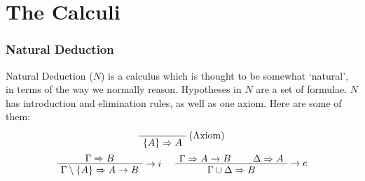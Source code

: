 \documentclass[english,svgnames,hide notes,12pt]{beamer}
\theoremstyle{definition}
\newtheorem{defn}{Definition}
\theoremstyle{remark}
\newtheorem{notn}{Notation}
\begin{document}

\section{The Calculi}

\begin{frame}
    \frametitle{Natural Deduction}
    Natural Deduction ($N$) is a calculus which is thought to be somewhat `natural', in terms of the way we normally reason. Hypotheses in $N$ are a set of formulae. $N$ has introduction and elimination rules, as well as one axiom. Here are some of them:

    \[
        \AxiomC{}
        \RightLabel{(Axiom)}
        \UnaryInfC{$\{A\} \Rightarrow A$}
        \DisplayProof 
    \]
    \[
        \AxiomC{$\Gamma \Rightarrow B$}
        \RightLabel{$\to i$}
        \UnaryInfC{$\Gamma\setminus\{A\}\Rightarrow A\to B$}
        \DisplayProof
        \hspace{0.5cm}
        \AxiomC{$\Gamma\Rightarrow A\to B$}
        \AxiomC{$\Delta\Rightarrow A$}
        \RightLabel{$\to e$}
        \BinaryInfC{$\Gamma\cup\Delta\Rightarrow B$}
        \DisplayProof
    \]
\end{frame}



\end{document}
